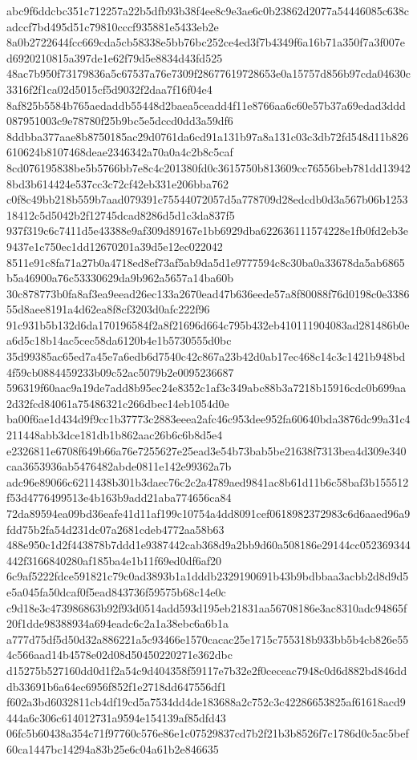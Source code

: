 \documentclass[11pt,a4paper]{article}
\begin{document}
{abc9f6ddcbc351c712257a22b5dfb93b38f4ee8c9e3ae6c0b23862d2077a54446085c638cadccf7bd495d51c79810cccf935881e5433eb2e
8a0b2722644fcc669cda5cb58338e5bb76bc252ce4ed3f7b4349f6a16b71a350f7a3f007ed6920210815a397de1e62f79d5e8834d43fd525
48ac7b950f73179836a5c67537a76e7309f28677619728653e0a15757d856b97cda04630c3316f2f1ca02d5015cf5d9032f2daa7f16f04e4
8af825b5584b765aedaddb55448d2baea5ceadd4f11e8766aa6c60e57b37a69edad3ddd087951003c9e78780f25b9bc5e5dccd0dd3a59df6
8ddbba377aae8b8750185ac29d0761da6cd91a131b97a8a131c03c3db72fd548d11b826610624b8107468deae2346342a70a0a4c2b8c5caf
8cd076195838be5b5766bb7e8c4c201380fd0c3615750b813609cc76556beb781dd139428bd3b614424e537cc3c72cf42eb331e206bba762
c0f8c49bb218b559b7aad079391c75544072057d5a778709d28edcdb0d3a567b06b125318412c5d5042b2f12745dcad8286d5d1c3da837f5
937f319c6c7411d5e43388e9af309d89167e1bb6929dba622636111574228e1fb0fd2eb3e9437e1c750ec1dd12670201a39d5e12ec022042
8511e91c8fa71a27b0a4718ed8ef73af5ab9da5d1e9777594c8c30ba0a33678da5ab6865b5a46900a76c53330629da9b962a5657a14ba60b
30c878773b0fa8af3ea9eead26ec133a2670ead47b636eede57a8f80088f76d0198c0e338655d8aee8191a4d62ea8f8cf3203d0afc222f96
91c931b5b132d6da170196584f2a8f21696d664c795b432eb410111904083ad281486b0ea6d5c18b14ac5cec58da6120b4e1b5730555d0bc
35d99385ac65ed7a45e7a6edb6d7540c42c867a23b42d0ab17ec468c14c3c1421b948bd4f59cb0884459233b09c52ac5079b2e0095236687
596319f60aac9a19de7add8b95ec24e8352c1af3c349abc88b3a7218b15916cdc0b699aa2d32fcd84061a75486321c266dbec14eb1054d0e
ba00f6ae1d434d9f9cc1b37773c2883eeea2afc46c953dee952fa60640bda3876dc99a31c4211448abb3dce181db1b862aac26b6c6b8d5e4
e2326811e6708f649b66a76e7255627e25ead3e54b73bab5be21638f7313bea4d309e340caa3653936ab5476482abde0811e142e99362a7b
adc96e89066c6211438b301b3daec76c2c2a4789aed9841ac8b61d11b6c58baf3b155512f53d4776499513e4b163b9add21aba774656ca84
72da89594ea09bd36eafe41d11af199c10754a4dd8091cef0618982372983c6d6aaed96a9fdd75b2fa54d231dc07a2681cdeb4772aa58b63
488e950c1d2f443878b7ddd1e9387442cab368d9a2bb9d60a508186e29144cc052369344442f3166840280af185ba4e1b11f69ed0df6af20
6c9af5222fdce591821c79c0ad3893b1a1dddb2329190691b43b9bdbbaa3acbb2d8d9d5e5a045fa50dcaf0f5ead843736f59575b68c14e0c
c9d18e3c473986863b92f93d0514add593d195eb21831aa56708186e3ac8310adc94865f20f1dde98388934a694eadc6c2a1a38ebc6a6b1a
a777d75df5d50d32a886221a5c93466e1570cacac25e1715c755318b933bb5b4cb826e554c566aad14b4578e02d08d50450220271e362dbc
d15275b527160dd0d1f2a54c9d404358f59117e7b32e2f0ceceac7948c0d6d882bd846dddb33691b6a64ec6956f852f1e2718dd647556df1
f602a3bd6032811cb4df19cd5a7534dd4de183688a2c752c3c42286653825af61618acd9444a6c306c614012731a9594e154139af85dfd43
06fc5b60438a354c71f97760c576e86e1c07529837cd7b2f21b3b8526f7c1786d0c5ac5bef60ca1447bc14294a83b25e6c04a61b2e846635
}
\end{document}
